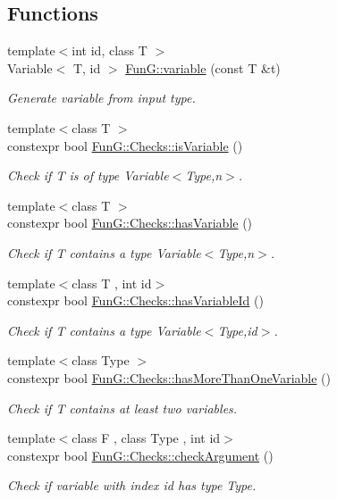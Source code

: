 \subsection*{Functions}
\begin{DoxyCompactItemize}
\item 
{\footnotesize template$<$int id, class T $>$ }\\Variable$<$ T, id $>$ \hyperlink{namespaceFunG_a1c474456411f028e14eab67ff6eebe0c}{Fun\+G\+::variable} (const T \&t)
\begin{DoxyCompactList}\small\item\em Generate variable from input type. \end{DoxyCompactList}\item 
{\footnotesize template$<$class T $>$ }\\constexpr bool \hyperlink{group__Checks_gac2a1a8aedf54c42cb6d47b3b64bbc761}{Fun\+G\+::\+Checks\+::is\+Variable} ()
\begin{DoxyCompactList}\small\item\em Check if T is of type Variable$<$\+Type,n$>$. \end{DoxyCompactList}\item 
{\footnotesize template$<$class T $>$ }\\constexpr bool \hyperlink{group__Checks_ga6d289274975a662346a1b5adf0d31f37}{Fun\+G\+::\+Checks\+::has\+Variable} ()
\begin{DoxyCompactList}\small\item\em Check if T contains a type Variable$<$\+Type,n$>$. \end{DoxyCompactList}\item 
{\footnotesize template$<$class T , int id$>$ }\\constexpr bool \hyperlink{group__Checks_ga0d42132679e0563893cc6c1809dc9a55}{Fun\+G\+::\+Checks\+::has\+Variable\+Id} ()
\begin{DoxyCompactList}\small\item\em Check if T contains a type Variable$<$\+Type,id$>$. \end{DoxyCompactList}\item 
{\footnotesize template$<$class Type $>$ }\\constexpr bool \hyperlink{group__Checks_ga5ff379f125d36c212332fd51012195d5}{Fun\+G\+::\+Checks\+::has\+More\+Than\+One\+Variable} ()
\begin{DoxyCompactList}\small\item\em Check if T contains at least two variables. \end{DoxyCompactList}\item 
{\footnotesize template$<$class F , class Type , int id$>$ }\\constexpr bool \hyperlink{group__Checks_ga31790e5d021a40ac34b7469323c658f9}{Fun\+G\+::\+Checks\+::check\+Argument} ()
\begin{DoxyCompactList}\small\item\em Check if variable with index id has type Type. \end{DoxyCompactList}\end{DoxyCompactItemize}
